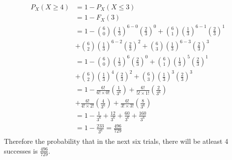 \documentclass[journal,12pt,twocolumn]{IEEEtran}
\begin{document}
\begin{multline}
\begin{split}
P_X(X \ge 4)&= 1-P_X(X \le 3)\\
&=1-F_X(3)\\
&=1-\binom{6}{0}\left(\frac{1}{3}\right)^{6-0}\left(\frac{2}{3}\right)^{0}+ \binom{6}{1}\left(\frac{1}{3}\right)^{6-1}\left(\frac{2}{3}\right)^{1}\\&+ \binom{6}{2}\left(\frac{1}{3}\right)^{6-2}\left(\frac{2}{3}\right)^{2}+ \binom{6}{3}\left(\frac{1}{3}\right)^{6-3}\left(\frac{2}{3}\right)^{3}\\
&=1-\binom{6}{0}\left(\frac{1}{3}\right)^{6}\left(\frac{2}{3}\right)^{0}+ \binom{6}{1}\left(\frac{1}{3}\right)^{5}\left(\frac{2}{3}\right)^{1}\\&+ \binom{6}{2}\left(\frac{1}{3}\right)^{4}\left(\frac{2}{3}\right)^{2}+ \binom{6}{3}\left(\frac{1}{3}\right)^{3}\left(\frac{2}{3}\right)^{3}\\
&=1-\frac{6!}{6!\times 0!}\left(\frac{1}{3^{6}}\right)+ \frac{6!}{5!\times 1!}\left(\frac{2}{3^{6}}\right)\\&+ \frac{6!}{4!\times 2!}\left(\frac{4}{3^{6}}\right)+ \frac{6!}{3!\times 3!}\left(\frac{8}{3^{6}}\right)\\
&=1- \frac{1}{3^{6}}+ \frac{12}{3^{6}}+ \frac{60}{3^{6}}+ \frac{160}{3^{6}}\\
&= 1-\frac{233}{3^{6}}= \frac{496}{729}
\end{split}
\end{multline}
Therefore the probability that in the next six trials, there will be atleast 4 successes is $\frac{496}{729}$.
\end{document}
